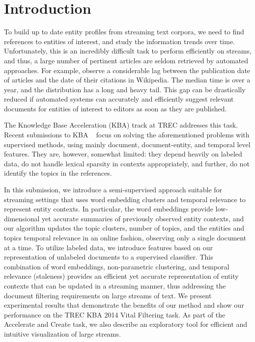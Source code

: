 \documentclass{article}
\begin{document}
\section{Introduction}
\label{intro}

To build up to date entity profiles from streaming text corpora, we need to find references to entities of interest, and study the information trends over time. 
Unfortunately, this is an incredibly difficult task to perform efficiently on streams, and thus, a large number of pertinent articles are seldom retrieved by automated approaches.
For example, \citet{frank12} observe a considerable lag between the publication date of articles and the date of their citations in Wikipedia.
The median time is over a year, and the distribution has a long and heavy tail. 
This gap can be drastically reduced if automated systems can accurately and efficiently suggest relevant documents for entities of interest to editors as soon as they are published.

The Knowledge Base Acceleration (KBA) track at TREC addresses this task.
Recent submissions to KBA ~\cite{xitong13, bouvier13, efron13, zhang13, bellogin13} focus on solving the aforementioned problems with supervised methods, using mainly document, document-entity, and temporal level features.
They are, however, somewhat limited: they depend heavily on labeled data, do not handle lexical sparsity in contexts appropriately, and further, do not identify the topics in the references. %


In this submission, we introduce a semi-supervised approach suitable for streaming settings that uses word embedding clusters and temporal relevance to represent entity contexts. %
In particular, the word embeddings provide low-dimensional yet accurate summaries of previously observed entity contexts, and our algorithm updates the topic clusters, number of topics, and the entities and topics temporal relevance in an online fashion, observing only a single document at a time.
To utilize labeled data, we introduce features based on our representation of unlabeled documents to a supervised classifier.
%
This combination of word embeddings, non-parametric clustering, and temporal relevance (staleness) provides an efficient yet accurate representation of entity contexts that can be updated in a streaming manner, thus addressing the document filtering requirements on large streams of text.
We present experimental results that demonstrate the benefits of our method and show our performance on the TREC KBA 2014 Vital Filtering task.
As part of the Accelerate and Create task, we also describe an exploratory tool for efficient and intuitive visualization of large streams.
\end{document}
